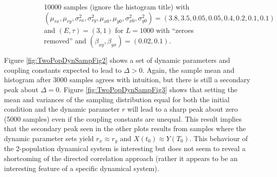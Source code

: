 \documentclass[a4paper,11pt]{article}
\begin{document}
\begin{figure}[h!t]
\begin{subfigure}[b]{0.4\textwidth}
\caption{10000 samples (ignore the histogram title) with $\left(\mu_{rx},\mu_{ry},\sigma^2_{rx},\sigma^2_{ry},\mu_{x0},\mu_{y0},\sigma^2_{x0},\sigma^2_{y0}\right) = \left(3.8,3.5,0.05,0.05,0.4,0.2,0.1,0.1\right)$ and $\left(E,\tau\right)=\left(3,1\right)$ for $L=1000$ with ``zeroes removed'' and $(\beta_{xy},\beta_{yx})=(0.02,0.1)$.}
\end{subfigure}
\caption{}
\end{figure}
Figure \ref{fig:TwoPopDynSampFig2} shows a set of dynamic parameters and coupling constants expected to lead to $\Delta>0$.  Again, the sample mean and histogram after 3000 samples agrees with intuition, but there is still a secondary peak about $\Delta=0$.  Figure \ref{fig:TwoPopDynSampFig3} shows that setting the mean and variances of the sampling distribution equal for both the initial condition and the dynamic parameter $r$ will lead to a sharp peak about zero (5000 samples) even if the coupling constants are unequal.  This result implies that the secondary peak seen in the other plots results from samples where the dynamic parameter sets yield $r_x\approx r_y$ and $X(t_0)\approx Y(T_0)$.  This behaviour of the 2-population dynamical system is interesting but does not seem to reveal a shortcoming of the directed correlation approach (rather it appears to be an interesting feature of a specific dynamical system).
\end{document}
